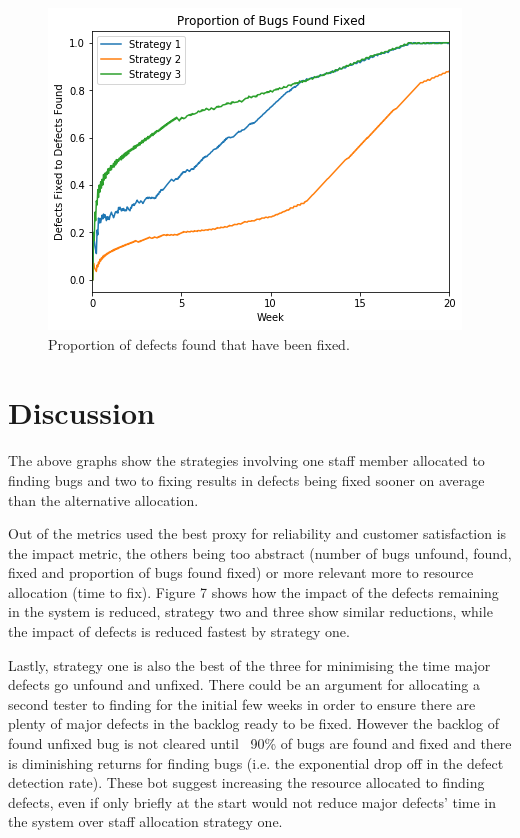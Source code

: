 \documentclass[12pt,a4paper]{article}
\begin{document}
	\begin{figure}[p]
		\centering
		\includegraphics[scale=0.6]{sim_fix_found_proportion}
		\caption{Proportion of defects found that have been fixed.}
	\end{figure}
	\newpage
	
	\section{Discussion}
	
	
	The above graphs show the strategies involving one staff member allocated to finding bugs and two to fixing results in defects being fixed sooner on average than the alternative allocation.
	
	Out of the metrics used the best proxy for reliability and customer satisfaction is the impact metric, the others being too abstract (number of bugs unfound, found, fixed and proportion of bugs found fixed) or more relevant more to resource allocation (time to fix). Figure 7 shows how the impact of the defects remaining in the system is reduced, strategy two and three show similar reductions, while the impact of defects is reduced fastest by strategy one.
	
	Lastly, strategy one is also the best of the three for minimising the time major defects go unfound and unfixed. There could be an argument for allocating a second tester to finding for the initial few weeks in order to ensure there are plenty of major defects in the backlog ready to be fixed. However the backlog of found unfixed bug is not cleared until ~90\% of bugs are found and fixed and there is diminishing returns for finding bugs (i.e. the exponential drop off in the defect detection rate). These bot suggest increasing the resource allocated to finding defects, even if only briefly at the start would not reduce major defects' time in the system over staff allocation strategy one.
	

	
	
\end{document}
